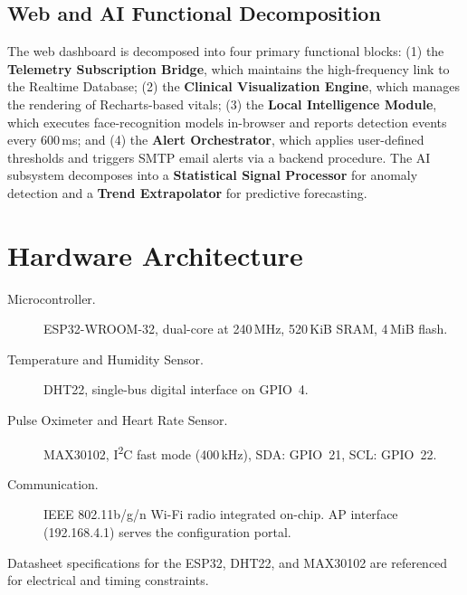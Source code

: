 \subsection*{Web and AI Functional Decomposition}
The web dashboard is decomposed into four primary functional blocks: (1) the \textbf{Telemetry Subscription Bridge}, which maintains the high-frequency link to the Realtime Database\cite{firebase_rtdb}; (2) the \textbf{Clinical Visualization Engine}, which manages the rendering of Recharts\cite{recharts}-based vitals; (3) the \textbf{Local Intelligence Module}, which executes face-recognition\cite{faceapi} models in-browser and reports detection events every 600\,ms; and (4) the \textbf{Alert Orchestrator}, which applies user-defined thresholds and triggers SMTP email alerts via a backend procedure. The AI subsystem decomposes into a \textbf{Statistical Signal Processor} for anomaly detection and a \textbf{Trend Extrapolator} for predictive forecasting.

\section{Hardware Architecture}

\begin{description}
	\item[Microcontroller.]
	      ESP32-WROOM-32, dual-core at 240\,MHz,
	      520\,KiB SRAM, 4\,MiB flash.

	\item[Temperature and Humidity Sensor.]
	      DHT22, single-bus digital interface on GPIO~4.

	\item[Pulse Oximeter and Heart Rate Sensor.]
	      MAX30102, I\textsuperscript{2}C fast mode (400\,kHz), SDA: GPIO~21,
	      SCL: GPIO~22.

	\item[Communication.]
	      IEEE 802.11b/g/n Wi-Fi radio integrated on-chip.
	      AP interface (192.168.4.1) serves the configuration portal.
\end{description}
Datasheet specifications for the ESP32, DHT22, and MAX30102 are referenced for electrical and timing constraints.\cite{esp32_datasheet,dht22_datasheet,max30102_datasheet}

